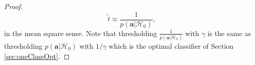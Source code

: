 \documentclass[draftcls,onecolumn,12pt]{IEEEtran}
\begin{document}
\begin{proof}
\begin{equation}
\label{eq:approx}
	\tilde{t} \approx \frac{1}{p(\mathbf{a}|\mathcal{H}_0)},	
\end{equation} 
in the mean square sense. Note that thresholding $\frac{1}{p(\mathbf{a}|\mathcal{H}_0)}$ with $\gamma$ is the same as thresholding $p(\mathbf{a}|\mathcal{H}_0)$ with $1/\gamma$ which is the optimal classifier of Section \ref{sec:oneClassOpt}.
\end{proof}



\end{document}
